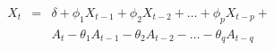 

\begin{eqnarray*}
X_{t} & = & \delta + \phi_{1}X_{t-1} + \phi_{2}X_{t-2} + \ldots + \phi_{p}X_{t-p} + \\ 
    &   & A_{t} - \theta_{1}A_{t-1} - \theta_{2}A_{t-2} - \ldots - \theta_{q}A_{t-q}
\end{eqnarray*}


